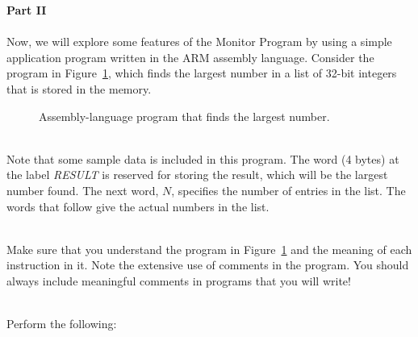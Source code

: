 \documentclass[epsfig,10pt,fullpage]{article}
\begin{document}
\clearpage
\noindent
{\bf Part II}
~\\
~\\
\noindent
Now, we will explore some features of the Monitor Program by using a
simple application program written in the ARM assembly language.
Consider the program in Figure~\ref{fig:code}, which finds the largest number in a list
of 32-bit integers that is stored in the memory.

\begin{figure}[H]
\begin{center}

\end{center}
\caption{Assembly-language program that finds the largest number.}
\label{fig:code}
\end{figure}

~\\
\noindent
Note that some sample data is included in this program.
The word (4 bytes) at the label {\it RESULT} is reserved for storing the result, which will be 
the largest number found. The next word, $N$, specifies the number of entries in the list.
The words that follow give the actual numbers in the list.

~\\
\noindent
Make sure that you understand the program in Figure~\ref{fig:code} and the meaning of each 
instruction in it. Note the extensive use of comments in the program.
You should always include meaningful comments in programs that you will write!

~\\
\noindent
Perform the following:
\end{document}
